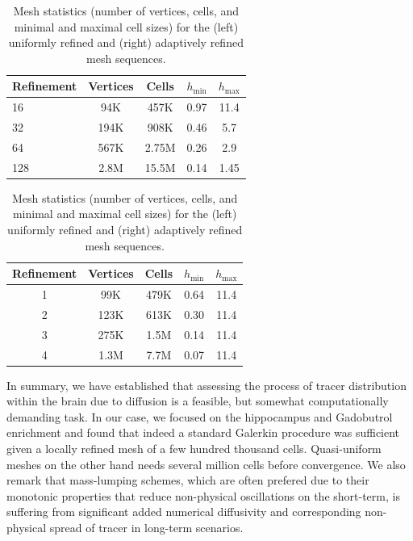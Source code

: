 \begin{table}%
  \centering
  \begin{minipage}{.45\textwidth}%
    \begin{tabular}{l|cccc}
      Refinement & Vertices & Cells  & $h_{\min}$ & $h_{\max}$ \\ \hline
      16 & 94K & 457K & 0.97 & 11.4 \\  
      32 & 194K & 908K &  0.46 & 5.7 \\  
      64 & 567K &  2.75M & 0.26 & 2.9 \\
      128 &  2.8M & 15.5M &  0.14 & 1.45
    \end{tabular}
  \end{minipage}%
  \hspace{2em}
  \begin{minipage}{.45\textwidth}%
    \begin{tabular}{c|cccc}
	    Refinement & Vertices & Cells & $h_{\min}$ & $h_{\max}$ \\ \hline
	     1 & 99K &  479K &  0.64 &  11.4 \\
	     2 & 123K& 613K & 0.30 &  11.4 \\
	     3 & 275K &  1.5M  &  0.14 & 11.4 \\
	     4 & 1.3M &  7.7M  & 0.07 &  11.4 \\
    \end{tabular}
  \end{minipage}%
%
  \caption{Mesh statistics (number of vertices, cells, and minimal and
    maximal cell sizes) for the (left) uniformly refined and
    (right) adaptively refined mesh sequences.}
  \label{chp6:meshstat}
\end{table}

In summary, we have established that assessing the process of tracer
distribution within the brain due to diffusion is a feasible, but
somewhat computationally demanding task. In our case, we focused on
the hippocampus and Gadobutrol enrichment and found that indeed a
standard Galerkin procedure was sufficient given a locally refined
mesh of a few hundred thousand cells. Quasi-uniform meshes on the
other hand needs several million cells before convergence. We also
remark that mass-lumping schemes, which are often prefered due to
their monotonic properties that reduce non-physical oscillations on
the short-term, is suffering from significant added numerical
diffusivity and corresponding non-physical spread of tracer in
long-term scenarios.
